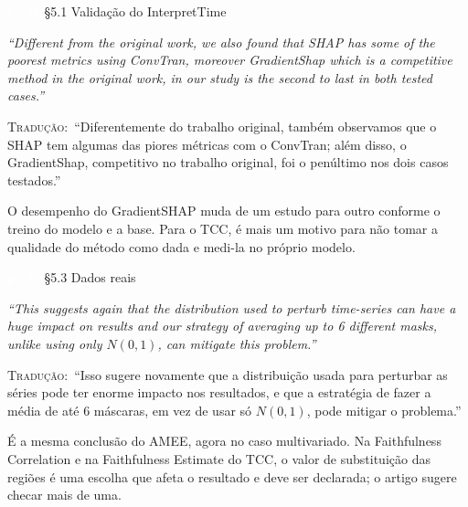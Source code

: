 \documentclass[11pt,a4paper]{article}
\newcommand{\pagechip}[1]{{\setlength{\fboxsep}{1.5pt}\colorbox{cAcc}{\textcolor{white}{\scriptsize\texttt{#1}}}}}
\newenvironment{origquote}{\par\itshape\small}{\par}
\newenvironment{tradquote}{\par\small\textsc{Tradução:}\ }{\par}
\newcommand{\explab}[1]{\par\smallskip{\small\color{cAcc}\textbf{\MakeUppercase{#1}}}\par}
\begin{document}
\begin{citacard}{\pagechip{p. 11} §5.1 Validação do InterpretTime}
\begin{origquote}“Different from the original work, we also found that SHAP has some of the poorest metrics using ConvTran, moreover GradientShap which is a competitive method in the original work, in our study is the second to last in both tested cases.”\end{origquote}
\begin{tradquote}“Diferentemente do trabalho original, também observamos que o SHAP tem algumas das piores métricas com o ConvTran; além disso, o GradientShap, competitivo no trabalho original, foi o penúltimo nos dois casos testados.”\end{tradquote}
\explab{Explicação}
O desempenho do GradientSHAP muda de um estudo para outro conforme o treino do modelo e a base. Para o TCC, é mais um motivo para não tomar a qualidade do método como dada e medi-la no próprio modelo.
\end{citacard}

\begin{citacard}{\pagechip{p. 15} §5.3 Dados reais}
\begin{origquote}“This suggests again that the distribution used to perturb time-series can have a huge impact on results and our strategy of averaging up to 6 different masks, unlike using only $N(0,1)$, can mitigate this problem.”\end{origquote}
\begin{tradquote}“Isso sugere novamente que a distribuição usada para perturbar as séries pode ter enorme impacto nos resultados, e que a estratégia de fazer a média de até 6 máscaras, em vez de usar só $N(0,1)$, pode mitigar o problema.”\end{tradquote}
\explab{Explicação}
É a mesma conclusão do AMEE, agora no caso multivariado. Na Faithfulness Correlation e na Faithfulness Estimate do TCC, o valor de substituição das regiões é uma escolha que afeta o resultado e deve ser declarada; o artigo sugere checar mais de uma.
\end{citacard}
\end{document}

